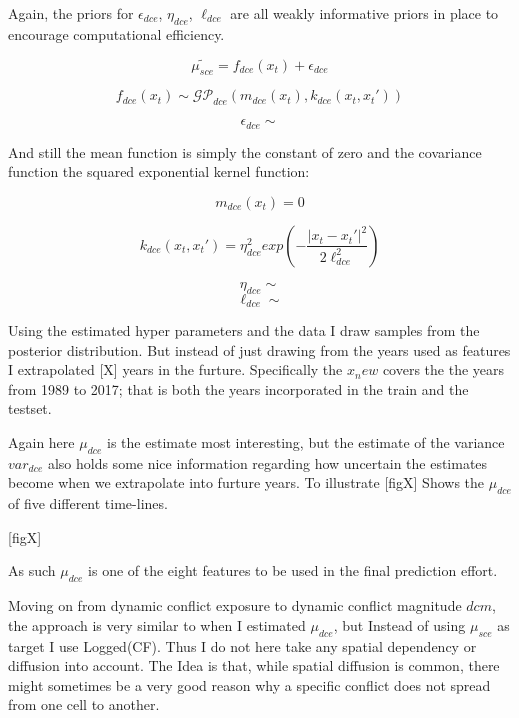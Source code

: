 \documentclass[a4paper]{article}
\begin{document}
Again, the priors for $\epsilon_{dce}$, $\eta_{dce}$, $\ell_{dce}$ are all weakly informative priors in place to encourage computational efficiency.\par

\[
\widetilde{\mu_{sce}} = f_{dce}(x_t) + \epsilon_{dce}
\]

\[
f_{dce}(x_t) \sim \mathcal{GP}_{dce}(m_{dce}(x_t),k_{dce}(x_t,x_t')) %
\]

\[
\epsilon_{dce} \sim 
\]

And still the mean function is simply the constant of zero and the covariance function the squared exponential kernel function:

\[
m_{dce}(x_t) = 0
\]

\[
k_{dce}(x_t,x_t') = \eta_{dce}^2 exp\left(-\frac{|x_t-x_t'|^2}{2\ell_{dce}^2}\right) %
\]

\[
\eta_{dce} \sim
\]
\[
\ell_{dce} \sim
\]

Using the estimated hyper parameters and the data I draw samples from the posterior distribution. But instead of just drawing from the years used as features I extrapolated [X] years in the furture. Specifically the $x_new$ covers the the years from 1989 to 2017; that is both the years incorporated in the train and the testset.\par

Again here $\mu_{dce}$ is the estimate most interesting, but the estimate of the variance $var_{dce}$ also holds some nice information regarding how uncertain the estimates become when we extrapolate into furture years. To illustrate [figX] Shows the $\mu_{dce}$ of five different time-lines.\par

[figX]

As such $\mu_{dce}$ is one of the eight features to be used in the final prediction effort. 


Moving on from dynamic conflict exposure to dynamic conflict magnitude $dcm$, the approach is very similar to when I estimated $\mu_{dce}$, but Instead of using $\mu_{sce}$ as target I use Logged(CF). Thus I do not here take any spatial dependency or diffusion into account. The Idea is that, while spatial diffusion is common, there might sometimes be a very good reason why a specific conflict does not spread from one cell to another.\par
\end{document}
